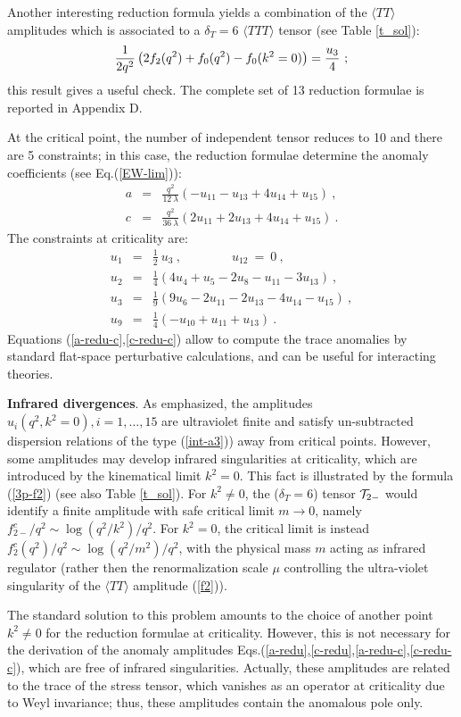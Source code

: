\documentclass[11pt]{article}
\newcommand{\beq}{\begin{equation}}
\newcommand{\eeq}{\end{equation}}
\newcommand{\bea}{\begin{eqnarray}}
\newcommand{\eea}{\end{eqnarray}}
\def\l{\lambda}
\def\nl{\nonumber\\}
\def\TTT{\bra TTT\ket}
\def\bra{\langle}
\def\ket{\rangle}
\def\dt{{\delta_T}} %
\begin{document}
Another interesting reduction formula yields a combination of the 
$\bra TT\ket$ amplitudes which is associated to a $\dt=6$ $\TTT$ 
tensor (see Table \ref{t_sol}):
\beq
{1\over 2 q^2}\left(2 f_2(q^2) +f_0(q^2) -f_0(k^2=0) \right)
 = \frac{u_3}{4}\ ;
\label{3p-f2}
\eeq
this result gives a useful check. 
The complete set of 13 reduction formulae is reported in Appendix D.

At the critical point, the number of independent tensor reduces to
10 and there are 5 constraints; in this case, the reduction formulae
determine the anomaly coefficients (see Eq.(\ref{EW-lim})):
\bea
a &=& \frac{q^2}{12\ \l}\left(
-u_{11} - u_{13} + 4 u_{14} + u_{15} \right)\ ,
\label{a-redu-c}
\\
c &=& \frac{q^2}{36\ \l}\left(
2 u_{11} + 2 u_{13} + 4 u_{14} + u_{15} \right)\ .
\label{c-redu-c}
\eea
The constraints at criticality are:
\bea
u_1 &=& \frac{1}{2}\ u_3 \ ,\qquad\qquad u_{12}\ =\ 0\ ,
\nl
u_2 &=& \frac{1}{4}\left(
4 u_4 + u_{5} - 2 u_{8} - u_{11} -3 u_{13} \right)\ ,
\nl
u_3 &=& \frac{1}{9}\left(
9 u_6 - 2 u_{11} - 2 u_{13} - 4 u_{14} - u_{15} \right)\ ,
\nl
u_9 &=& \frac{1}{4}\left(
- u_{10} + u_{11} + u_{13} \right)\ .
\label{u-con-c}
\eea
Equations (\ref{a-redu-c},\ref{c-redu-c}) allow to compute
 the trace anomalies by standard flat-space perturbative
calculations, and can be useful for interacting theories. 

\noindent
{\bf Infrared divergences}.
As emphasized, the amplitudes $u_i(q^2,k^2=0), i=1,\dots,15$ are ultraviolet
finite and satisfy un-subtracted dispersion relations of the type
(\ref{int-a3})) away from critical points.
However, some amplitudes may develop infrared singularities 
at criticality, which are introduced by the kinematical limit $k^2=0$.
This fact is illustrated by the formula (\ref{3p-f2}) 
(see also Table \ref{t_sol}).
For $k^2\neq 0$, the ($\dt=6$) tensor ${\cal T}_{2-}$
would identify a finite amplitude with safe critical
limit $m\to 0$, namely $f^c_{2-}/q^2\sim \log(q^2/k^2)/q^2$.
For $k^2= 0$, the critical limit  is instead
$f^c_2(q^2)/q^2\sim \log(q^2/m^2)/q^2$, with the physical mass $m$
acting as infrared regulator (rather then the renormalization scale
$\mu$ controlling the ultra-violet singularity
of the $\bra TT\ket$ amplitude (\ref{f2})).

The standard solution to this problem amounts to the choice of
another point $k^2\neq 0$ for the reduction formulae at criticality.
However, this is not necessary for the derivation of the
anomaly amplitudes
Eqs.(\ref{a-redu},\ref{c-redu},\ref{a-redu-c},\ref{c-redu-c}),
which are free of infrared singularities.
Actually, these amplitudes are related to the
trace of the stress tensor, which vanishes as an operator
at criticality due to Weyl invariance;
thus, these amplitudes contain the anomalous pole only.
\end{document}
